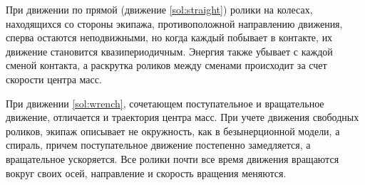 При движении по прямой (движение \ref{sol:straight}) ролики на колесах, находящихся со стороны экипажа, противоположной направлению движения, сперва остаются неподвижными, но когда каждый побывает в контакте, их движение становится квазипериодичным. Энергия также убывает с каждой сменой контакта, а раскрутка роликов между сменами происходит за счет скорости центра масс.

При движении \ref{sol:wrench}, сочетающем поступательное и вращательное движение, отличается и траектория центра масс. При учете движения свободных роликов, экипаж описывает не окружность, как в безынерционной модели, а спираль, причем поступательное движение постепенно замедляется, а вращательное ускоряется. Все ролики почти все время движения вращаются вокруг своих осей, направление и скорость вращения меняются.


